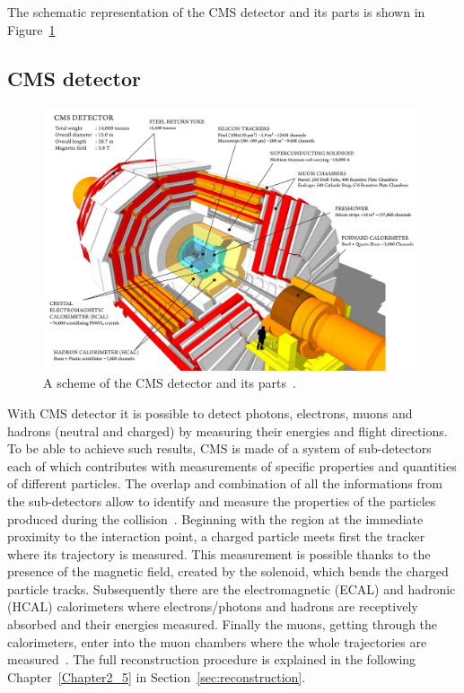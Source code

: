 The schematic representation of the CMS detector and its parts is
shown in Figure~\ref{fig:detector}


\subsection{CMS detector}\label{sec:cmsdetector}
\begin{figure}[h]
\centering
\includegraphics[width=0.98\textwidth]{Figures/c2/cms_160312_06-compressed.pdf}
\vspace*{3mm}
\caption{A scheme of the CMS detector and its parts~\cite{webpage_cms}.}
\label{fig:detector}
\end{figure} 
With CMS detector it is possible to detect photons, electrons, muons
and hadrons (neutral and charged) by measuring their energies and flight
directions. 
To be able to achieve such results, CMS is made of a system of sub-detectors each of which contributes with
measurements of specific properties and quantities of different 
particles. The overlap and combination of all the
informations from the sub-detectors allow to identify and measure the
properties of the particles produced during the collision~\cite{CMS:particleflow}. Beginning
with the region at the immediate proximity to the interaction point, a
charged particle meets first the tracker where its trajectory is
measured. This measurement is possible thanks to the presence of the
magnetic field, created by the solenoid, which bends the charged
particle tracks. Subsequently there are the
electromagnetic (ECAL) and hadronic (HCAL) calorimeters where
electrons/photons and hadrons are receptively absorbed and their
energies measured. Finally the muons, getting through the
calorimeters, enter into the muon chambers where the whole trajectories
are measured~\cite{CMS:particleflow}. The full reconstruction
procedure is explained in the following Chapter~\ref{Chapter2_5} in Section~\ref{sec:reconstruction}.\\

